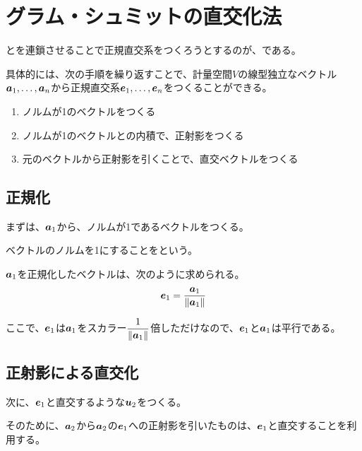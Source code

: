 \documentclass[../../../topic_linear-algebra]{subfiles}
\begin{document}
\sectionline
\section{グラム・シュミットの直交化法}

とを連鎖させることで正規直交系をつくろうとするのが、である。

\br

具体的には、次の手順を繰り返すことで、計量空間$V$の線型独立なベクトル$\vb*{a}_1, \ldots, \vb*{a}_n$から正規直交系$\vb*{e}_1, \ldots, \vb*{e}_n$をつくることができる。

\begin{enumerate}
  \item ノルムが1のベクトルをつくる
  \item ノルムが1のベクトルとの内積で、正射影をつくる
  \item 元のベクトルから正射影を引くことで、直交ベクトルをつくる
\end{enumerate}

\subsection{正規化}

まずは、$\vb*{a}_1$から、ノルムが1であるベクトルをつくる。

ベクトルのノルムを1にすることをという。

\br

$\vb*{a}_1$を正規化したベクトルは、次のように求められる。
\begin{equation*}
  \vb*{e}_1 = \frac{\vb*{a}_1}{\|\vb*{a}_1\|}
\end{equation*}

ここで、$\vb*{e}_1$は$\vb*{a}_1$をスカラー$\dfrac{1}{\|\vb*{a}_1\|}$倍しただけなので、$\vb*{e}_1$と$\vb*{a}_1$は平行である。

\subsection{正射影による直交化}

次に、$\vb*{e}_1$と直交するような$\vb*{u}_2$をつくる。

そのために、$\vb*{a}_2$から$\vb*{a}_2$の$\vb*{e}_1$への正射影を引いたものは、$\vb*{e}_1$と直交することを利用する。
\end{document}

